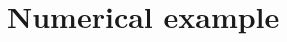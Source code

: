 \documentclass[graybox]{svmult}
\newenvironment{spmatrix}[1]
 {\def\mysubscript{#1}\mathop\bgroup\begin{pmatrix}}
 {\end{pmatrix}\egroup_{\textstyle\mathstrut\mysubscript}}
\begin{document}
%

%

\section{Numerical example}
\end{document}
